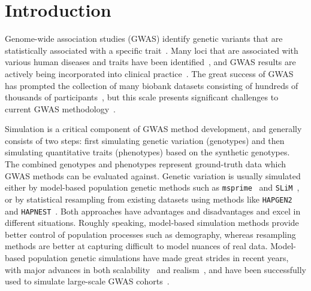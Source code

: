 \documentclass[unnumsec,webpdf,modern,large,namedate]{oup-authoring-template}%
\begin{document}

\maketitle

\section{Introduction}

Genome-wide association studies (GWAS)
identify genetic variants that are statistically
associated with a specific trait~\citep{uffelmann2021}.
Many loci that are associated with various human diseases and
traits have been
identified~\citep[e.g.][]{yengo2022,mathieson2023},
and GWAS results are actively being incorporated into clinical
practice~\citep{visscher2017}.
The great success of GWAS has prompted the collection of many biobank
datasets consisting of hundreds of thousands of
participants~\citep{tanjo2021practical},
but this scale presents significant challenges to
current GWAS methodology~\citep{uffelmann2021}.

Simulation is a critical component of GWAS method development, and
generally consists of two steps:
first simulating genetic variation (genotypes)
and then simulating quantitative traits (phenotypes) based on the
synthetic genotypes.
The combined genotypes and phenotypes represent ground-truth data
which GWAS methods can be evaluated against.
Genetic variation is
usually simulated either by model-based population genetic
methods such as
\texttt{msprime}~\citep{baumdicker2022efficient}
and \texttt{SLiM}~\citep{haller2023},
or by statistical resampling from existing datasets
using methods like \texttt{HAPGEN2}~\citep{su2011hapgen2}
and \texttt{HAPNEST}~\citep{wharrie2023hapnest}.
Both approaches have advantages and disadvantages and excel
in different situations.
Roughly speaking, model-based simulation methods
provide better control of population processes such as demography,
whereas resampling methods are better at capturing
difficult to model nuances of real data.
Model-based population genetic simulations have made
great strides in recent years, with major advances in both
scalability~\citep{kelleher2016efficient,kelleher2018efficient,haller2018tree}
and realism~\citep{adrion2020,anderson2023}, and
have been successfully used to simulate large-scale GWAS
cohorts~\cite[e.g.][]{martin2017,zaidi2020}.
\end{document}
